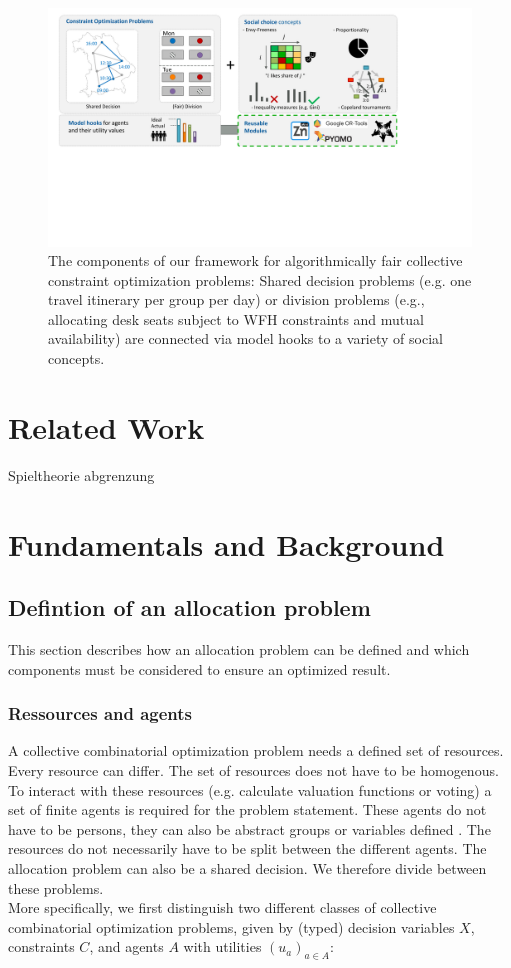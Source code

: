 \documentclass[german, a4paper, 11pt, oneside]{scrbook}
\begin{document}
\begin{figure}[h]
    \centering
    \includegraphics[width=\textwidth]{overview.pdf}
    \caption{The components of our framework for algorithmically fair collective constraint optimization problems: Shared decision problems (e.g. one travel itinerary per group per day) or division problems (e.g., allocating desk seats subject to WFH constraints and mutual availability) are connected via model hooks to a variety of social concepts.}
    \label{fig:overview}
\end{figure}
\chapter{Related Work}
Spieltheorie abgrenzung
\chapter{Fundamentals and Background}
\section{Defintion of an allocation problem}
This section describes how an allocation problem can be defined and which components must be considered to ensure an optimized result.
\subsection{Ressources and agents}
A collective combinatorial optimization problem needs a defined set of resources. Every resource can differ. The set of resources does not have to be homogenous. To interact with these resources (e.g. calculate valuation functions or voting) a set of finite agents is required for the problem statement. These agents do not have to be persons, they can also be abstract groups or variables defined \cite{.2022, FelixBrandtVincentConitzerUlleEndrissJeromeLangandArielD.Procaccia.}. The resources do not necessarily have to be split between the different agents. The allocation problem can also be a shared decision. We therefore divide between these problems. \\More specifically, we first distinguish two different classes of collective combinatorial optimization problems, given by (typed) decision variables $X$, constraints $C$, and agents $A$ with utilities $(u_a)_{a \in A}$:
\end{document}
